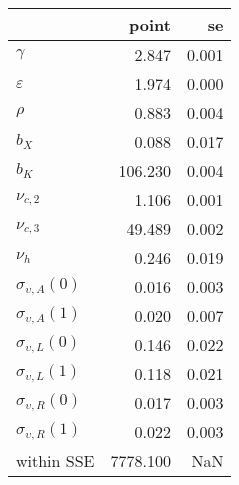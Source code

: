 \begin{tabular}{lrr}
\toprule
{} &     point &     se \\
\midrule
$\gamma$                 &     2.847 &  0.001 \\
$\varepsilon$            &     1.974 &  0.000 \\
$\rho$                   &     0.883 &  0.004 \\
$b_X$                    &     0.088 &  0.017 \\
$b_K$                    &   106.230 &  0.004 \\
$\nu_{c,2}$              &     1.106 &  0.001 \\
$\nu_{c,3}$              &    49.489 &  0.002 \\
$\nu_{h}$                &     0.246 &  0.019 \\
$\sigma_{\upsilon,A}(0)$ &     0.016 &  0.003 \\
$\sigma_{\upsilon,A}(1)$ &     0.020 &  0.007 \\
$\sigma_{\upsilon,L}(0)$ &     0.146 &  0.022 \\
$\sigma_{\upsilon,L}(1)$ &     0.118 &  0.021 \\
$\sigma_{\upsilon,R}(0)$ &     0.017 &  0.003 \\
$\sigma_{\upsilon,R}(1)$ &     0.022 &  0.003 \\
within SSE               &  7778.100 &    NaN \\
\bottomrule
\end{tabular}
